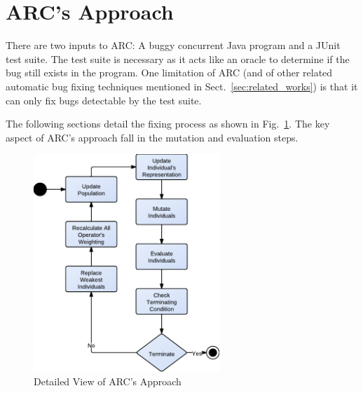 \section{ARC's Approach}
\label{sec:approach}



There are two inputs to ARC: A buggy concurrent Java program and a JUnit test
suite. The test suite is necessary as it acts like an oracle to determine if
the bug still exists in the program. One limitation of ARC (and of other
related automatic bug fixing techniques mentioned in
Sect.~\ref{sec:related_works}) is that it can only fix bugs detectable by the
test suite.



The following sections detail the fixing process as shown in
Fig.~\ref{fig:phases_internals}. The key aspect of ARC's approach fall in the
mutation and evaluation steps.

\begin{figure}[h]
  \centering
  \includegraphics[width=7cm]{figures/phases.pdf}
  \caption{Detailed View of ARC's Approach}
  \label{fig:phases_internals}
\end{figure}

